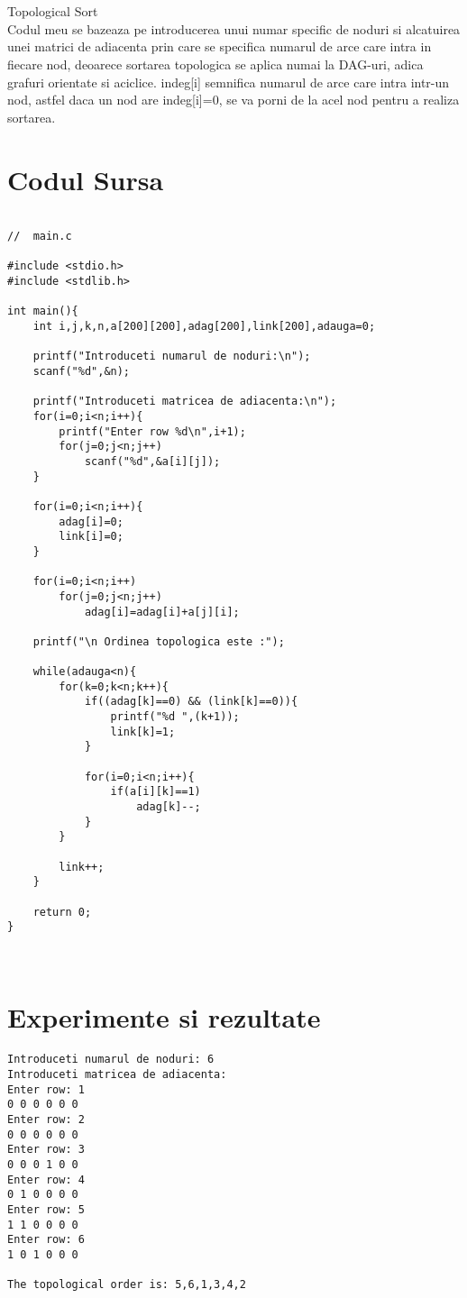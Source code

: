 ﻿\documentclass[14pt]{article}
\begin{document}
\\\vspace{3 mm}
\\Topological Sort
\\ Codul meu se bazeaza pe introducerea unui numar specific de noduri si alcatuirea unei matrici de adiacenta prin care se specifica numarul de arce care intra in fiecare nod, deoarece sortarea topologica se aplica numai la DAG-uri, adica grafuri orientate si aciclice. 
indeg[i] semnifica numarul de arce care intra intr-un nod, astfel daca un nod are indeg[i]=0, se va porni de la acel nod pentru a realiza sortarea.
\newpage
\section*{Codul Sursa}
\begin{lstlisting}

//  main.c

#include <stdio.h>
#include <stdlib.h>

int main(){
    int i,j,k,n,a[200][200],adag[200],link[200],adauga=0;

    printf("Introduceti numarul de noduri:\n");
    scanf("%d",&n);

    printf("Introduceti matricea de adiacenta:\n");
    for(i=0;i<n;i++){
        printf("Enter row %d\n",i+1);
        for(j=0;j<n;j++)
            scanf("%d",&a[i][j]);
    }

    for(i=0;i<n;i++){
        adag[i]=0;
        link[i]=0;
    }

    for(i=0;i<n;i++)
        for(j=0;j<n;j++)
            adag[i]=adag[i]+a[j][i];

    printf("\n Ordinea topologica este :");

    while(adauga<n){
        for(k=0;k<n;k++){
            if((adag[k]==0) && (link[k]==0)){
                printf("%d ",(k+1));
                link[k]=1;
            }

            for(i=0;i<n;i++){
                if(a[i][k]==1)
                    adag[k]--;
            }
        }

        link++;
    }

    return 0;
}



\end{lstlisting}

\newpage
\section*{Experimente si rezultate}
\begin{lstlisting}
Introduceti numarul de noduri: 6
Introduceti matricea de adiacenta:
Enter row: 1
0 0 0 0 0 0
Enter row: 2
0 0 0 0 0 0
Enter row: 3
0 0 0 1 0 0
Enter row: 4
0 1 0 0 0 0
Enter row: 5
1 1 0 0 0 0
Enter row: 6
1 0 1 0 0 0

The topological order is: 5,6,1,3,4,2


\end{lstlisting}
\end{document}
